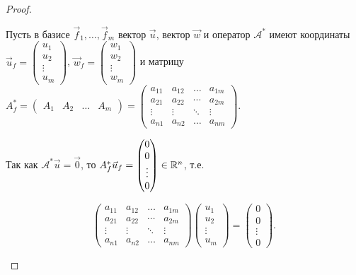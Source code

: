 \begin{proof}
\begin{description}
         Пусть в базисе $\vec{f}_1, \ldots, \vec{f}_m$ вектор $\vec{u}$, вектор $\vec{w}$ и оператор $\mathscr{A^*}$ имеют координаты $\vec{u}_f = \begin{pmatrix}
             u_1 \\
             u_2 \\
             \vdots \\
             u_m
         \end{pmatrix}$, $\vec{w}_f = \begin{pmatrix}
             w_1 \\
             w_2 \\
             \vdots \\
             w_m
         \end{pmatrix}$ и матрицу $A^*_f = \begin{pmatrix}
             A_1 & A_2 & \ldots & A_m
         \end{pmatrix} = \begin{pmatrix}
             a_{11} & a_{12} & \ldots & a_{1m} \\
             a_{21} & a_{22} & \cdots & a_{2m} \\
             \vdots & \vdots & \ddots & \vdots \\
             a_{n1} & a_{n2} & \ldots & a_{nm}
         \end{pmatrix}$.

         Так как $\mathscr{A^*}\vec{u} = \vec{0}$, то $A^*_f\vec{u}_f = \begin{pmatrix}
             0 \\
             0 \\
             \vdots \\
             0
         \end{pmatrix} \in \mathbb{R}^n$, т.е.

         $$\begin{pmatrix}
             a_{11} & a_{12} & \ldots & a_{1m} \\
             a_{21} & a_{22} & \cdots & a_{2m} \\
             \vdots & \vdots & \ddots & \vdots \\
             a_{n1} & a_{n2} & \ldots & a_{nm}
         \end{pmatrix}\begin{pmatrix}
             u_1 \\
             u_2 \\
             \vdots \\
             u_m
         \end{pmatrix} = \begin{pmatrix}
             0 \\
             0 \\
             \vdots \\
             0
         \end{pmatrix}.$$


\end{description}
\end{proof}
